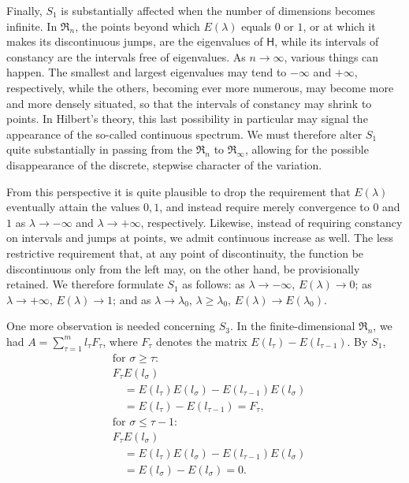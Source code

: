 \documentclass[fontsize=13pt,twoside,openany,headings=normal,parskip=false,bookmarkpackage=false,DIV=calc]{scrbook}
\begin{document}
Finally, $\hyperref[cond:II.S1]{S_1}$ is substantially affected when the number of dimensions becomes infinite. In $\mathfrak{R}_n$, the points beyond which $E(\lambda)$ equals $0$ or $1$, or at which it makes its discontinuous jumps, are the eigenvalues of $\mathsf H$, while its intervals of constancy are the intervals free of eigenvalues. As $n\to\infty$, various things can happen. The smallest and largest eigenvalues may tend to $-\infty$ and $+\infty$, respectively, while the others, becoming ever more numerous, may become more and more densely situated, so that the intervals of constancy may shrink to points. In Hilbert's theory, this last possibility in particular may signal the appearance of the so-called continuous spectrum. We must therefore alter $\hyperref[cond:II.S1]{S_1}$ quite substantially in passing from the $\mathfrak{R}_n$ to $\mathfrak{R}_\infty$, allowing for the possible disappearance of the discrete, stepwise character of the variation.

From this perspective it is quite plausible to drop the requirement that $E(\lambda)$ eventually attain the values $0,1$, and instead require merely convergence to $0$ and $1$ as $\lambda\to-\infty$ and $\lambda\to+\infty$, respectively. Likewise, instead of requiring constancy on intervals and jumps at points, we admit continuous increase as well. The less restrictive requirement that, at any point of discontinuity, the function be discontinuous only from the left may, on the other hand, be provisionally retained. We therefore formulate $\hyperref[cond:II.S1]{S_1}$ as follows: as $\lambda\to-\infty$, $E(\lambda)\to0$; as $\lambda\to+\infty$, $E(\lambda)\to1$; and as $\lambda\to\lambda_0$, $\lambda\geq\lambda_0$, $E(\lambda)\to E(\lambda_0)$.

One more observation is needed concerning $\hyperref[cond:II.S3]{S_3}$. In the finite-dimensional $\mathfrak{R}_n$, we had $A=\sum_{\tau=1}^m l_\tau F_\tau$, where $F_\tau$ denotes the matrix $E(l_\tau)-E(l_{\tau-1})$. By $\hyperref[cond:II.S1]{S_1}$,
\begin{align*}
&\text{for }\sigma\geq\tau:\\
&F_\tau E(l_\sigma)\\
&\quad=E(l_\tau)E(l_\sigma)-E(l_{\tau-1})E(l_\sigma)\\
&\quad=E(l_\tau)-E(l_{\tau-1})=F_\tau,\\
&\text{for }\sigma\leq\tau-1:\\
&F_\tau E(l_\sigma)\\
&\quad=E(l_\tau)E(l_\sigma)-E(l_{\tau-1})E(l_\sigma)\\
&\quad=E(l_\sigma)-E(l_\sigma)=0.
\end{align*}
\end{document}
